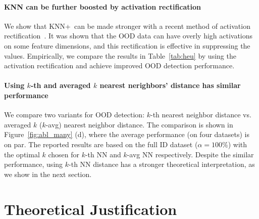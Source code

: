 \documentclass[nohyperref]{article}
\newcommand{\methodplus}{{KNN+}}
\theoremstyle{plain}
\theoremstyle{definition}
\theoremstyle{remark}
\begin{document}
\vspace{-0.1cm}
\paragraph{KNN can be further boosted by activation rectification} We show that \methodplus~can be made stronger with a recent method of activation rectification~\citep{sun2021react}. It was shown that the OOD data can have overly high activations on some feature dimensions, and this rectification is effective in suppressing the values. Empirically, we compare the results in Table~\ref{tab:heu} by using the activation rectification and achieve improved OOD detection performance. 


\begin{table}[h]
    \centering
    \caption{Comparison of KNN-based method with and without activation truncation. The ID data is ImageNet-1k. The value is averaged over all test OOD datasets.}
    \label{tab:heu}
\end{table}



\vspace{-0.1cm}
\paragraph{Using $k$-th and averaged $k$ nearest nerighbors' distance has similar performance}
We compare two variants for OOD detection: $k$-th nearest neighbor distance vs. averaged $k$ ($k$-avg) nearest neighbor distance. The comparison is shown in Figure~\ref{fig:abl_many} (d), where the average performance (on four datasets) is on par. The reported results are based on the full ID dataset ($\alpha=100\%$) with the optimal $k$ chosen for $k$-th NN and $k$-avg NN respectively. Despite the similar performance, using $k$-th NN distance has a stronger theoretical interpretation, as we show in the next section. 


\section{Theoretical Justification}
\label{sec:theory}
\end{document}
